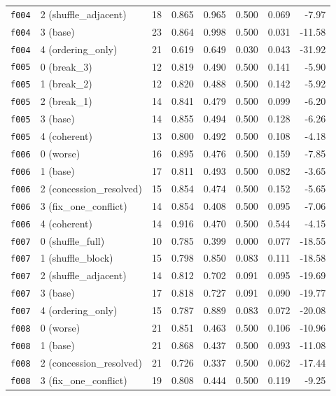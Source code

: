 \documentclass[11pt]{article}
\begin{document}
\begin{table}[htbp]
\begin{tabular}{llrrrrrr}
\texttt{f004} & 2 (shuffle\_adjacent) & 18 & 0.865 & 0.965 & 0.500 & 0.069 & -7.97 \\
\texttt{f004} & 3 (base) & 23 & 0.864 & 0.998 & 0.500 & 0.031 & -11.58 \\
\texttt{f004} & 4 (ordering\_only) & 21 & 0.619 & 0.649 & 0.030 & 0.043 & -31.92 \\
\midrule
\texttt{f005} & 0 (break\_3) & 12 & 0.819 & 0.490 & 0.500 & 0.141 & -5.90 \\
\texttt{f005} & 1 (break\_2) & 12 & 0.820 & 0.488 & 0.500 & 0.142 & -5.92 \\
\texttt{f005} & 2 (break\_1) & 14 & 0.841 & 0.479 & 0.500 & 0.099 & -6.20 \\
\texttt{f005} & 3 (base) & 14 & 0.855 & 0.494 & 0.500 & 0.128 & -6.26 \\
\texttt{f005} & 4 (coherent) & 13 & 0.800 & 0.492 & 0.500 & 0.108 & -4.18 \\
\midrule
\texttt{f006} & 0 (worse) & 16 & 0.895 & 0.476 & 0.500 & 0.159 & -7.85 \\
\texttt{f006} & 1 (base) & 17 & 0.811 & 0.493 & 0.500 & 0.082 & -3.65 \\
\texttt{f006} & 2 (concession\_resolved) & 15 & 0.854 & 0.474 & 0.500 & 0.152 & -5.65 \\
\texttt{f006} & 3 (fix\_one\_conflict) & 14 & 0.854 & 0.408 & 0.500 & 0.095 & -7.06 \\
\texttt{f006} & 4 (coherent) & 14 & 0.916 & 0.470 & 0.500 & 0.544 & -4.15 \\
\midrule
\texttt{f007} & 0 (shuffle\_full) & 10 & 0.785 & 0.399 & 0.000 & 0.077 & -18.55 \\
\texttt{f007} & 1 (shuffle\_block) & 15 & 0.798 & 0.850 & 0.083 & 0.111 & -18.58 \\
\texttt{f007} & 2 (shuffle\_adjacent) & 14 & 0.812 & 0.702 & 0.091 & 0.095 & -19.69 \\
\texttt{f007} & 3 (base) & 17 & 0.818 & 0.727 & 0.091 & 0.090 & -19.77 \\
\texttt{f007} & 4 (ordering\_only) & 15 & 0.787 & 0.889 & 0.083 & 0.072 & -20.08 \\
\midrule
\texttt{f008} & 0 (worse) & 21 & 0.851 & 0.463 & 0.500 & 0.106 & -10.96 \\
\texttt{f008} & 1 (base) & 21 & 0.868 & 0.437 & 0.500 & 0.093 & -11.08 \\
\texttt{f008} & 2 (concession\_resolved) & 21 & 0.726 & 0.337 & 0.500 & 0.062 & -17.44 \\
\texttt{f008} & 3 (fix\_one\_conflict) & 19 & 0.808 & 0.444 & 0.500 & 0.119 & -9.25 \\

\end{tabular}
\end{table}
\end{document}
